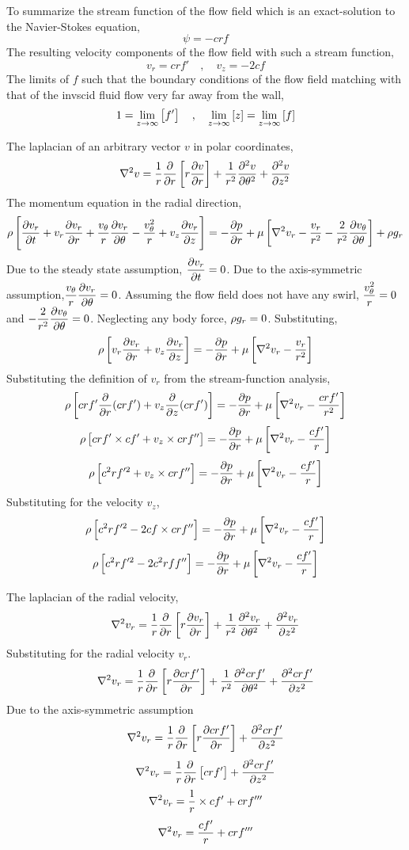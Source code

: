 \documentclass[class=report, 12pt, crop=false]{standalone}
\begin{document}
\begin{center}
To summarize the stream function of the flow field which is an exact-solution to the Navier-Stokes equation,
$$\psi = -crf$$
The resulting velocity components of the flow field with such a stream function,
$$v_r =  crf' \quad,\quad v_z = -2cf$$
The limits of $f$ such that the boundary conditions of the flow field matching with that of the invscid fluid flow very far away from the wall,
$$1 = \lim_{z\to\infty}\left[f'\right] \quad,\quad \lim_{z\to\infty}\left[z\right] = \lim_{z\to\infty}\left[f\right]$$



The laplacian of an arbitrary vector $v$ in polar coordinates,
$$\nabla^2 v = \frac{1}{r}\frac{\partial }{\partial r}\left[r\frac{\partial v}{\partial r}\right] + \frac{1}{r^2}\frac{\partial^2 v}{\partial \theta^2} + \frac{\partial^2 v}{\partial z^2}$$
The momentum equation in the radial direction,
$$\rho\left[\frac{\partial v_r}{\partial t}  + v_r\frac{\partial v_r}{\partial r} + \frac{v_\theta}{r}\frac{\partial v_r}{\partial \theta} - \frac{v_\theta^2}{r}  + v_z\frac{\partial v_r}{\partial z} \right] = -\frac{\partial p}{\partial r} + \mu\left[\nabla^2v_r - \frac{v_r}{r^2} - \frac{2}{r^2}\frac{\partial v_\theta}{\partial \theta}\right] + \rho g_r$$
Due to the steady state assumption, $\displaystyle{\frac{\partial v_r}{\partial t}=0}$. Due to the axis-symmetric assumption,$\displaystyle{\frac{v_\theta}{r}\frac{\partial v_r}{\partial\theta}=0}$. Assuming the flow field does not have any swirl, $\displaystyle{\frac{v_\theta^2}{r}=0}$ and $\displaystyle{- \frac{2}{r^2}\frac{\partial v_\theta}{\partial\theta}=0}$. Neglecting any body force, $\displaystyle{\rho g_r=0}$. Substituting,
$$\rho\left[v_r\frac{\partial v_r}{\partial r}  + v_z\frac{\partial v_r}{\partial z} \right] = -\frac{\partial p}{\partial r} + \mu\left[\nabla^2v_r - \frac{v_r}{r^2} \right]$$
Substituting the definition of $v_r$ from the stream-function analysis,
$$\rho\left[crf'\frac{\partial}{\partial r}(crf')  + v_z\frac{\partial}{\partial z}(crf') \right] = -\frac{\partial p}{\partial r} + \mu\left[\nabla^2v_r - \frac{crf'}{r^2} \right]$$
$$\rho\left[crf'\times cf'  + v_z\times crf'' \right] = -\frac{\partial p}{\partial r} + \mu\left[\nabla^2v_r - \frac{cf'}{r} \right]$$
$$\rho\left[c^2rf'^2  + v_z\times crf''\right] = -\frac{\partial p}{\partial r} + \mu\left[\nabla^2v_r - \frac{cf'}{r}\right]$$
Substituting for the velocity $v_z$,
$$\rho\left[c^2rf'^2 - 2cf\times crf''\right] = -\frac{\partial p}{\partial r} + \mu\left[\nabla^2v_r - \frac{cf'}{r}\right]$$
$$\rho\left[c^2rf'^2 - 2c^2rff''\right] = -\frac{\partial p}{\partial r} + \mu\left[\nabla^2v_r - \frac{cf'}{r}\right]$$

The laplacian of the radial velocity,
$$\nabla^2 v_r = \frac{1}{r}\frac{\partial }{\partial r}\left[r\frac{\partial v_r}{\partial r}\right] + \frac{1}{r^2}\frac{\partial^2 v_r}{\partial \theta^2} + \frac{\partial^2 v_r}{\partial z^2}$$
Substituting for the radial velocity $v_r$.
$$\nabla^2 v_r = \frac{1}{r}\frac{\partial }{\partial r}\left[r\frac{\partial crf'}{\partial r}\right] + \frac{1}{r^2}\frac{\partial^2 crf'}{\partial \theta^2} + \frac{\partial^2 crf'}{\partial z^2}$$
Due to the axis-symmetric assumption
$$\nabla^2 v_r = \frac{1}{r}\frac{\partial }{\partial r}\left[r\frac{\partial crf'}{\partial r}\right] + \frac{\partial^2 crf'}{\partial z^2}$$
$$\nabla^2 v_r = \frac{1}{r}\frac{\partial }{\partial r}\left[crf'\right] + \frac{\partial^2 crf'}{\partial z^2}$$
$$\nabla^2 v_r = \frac{1}{r}\times cf' + crf'''$$
$$\nabla^2 v_r = \frac{cf'}{r} + crf'''$$


\end{center}
\end{document}

